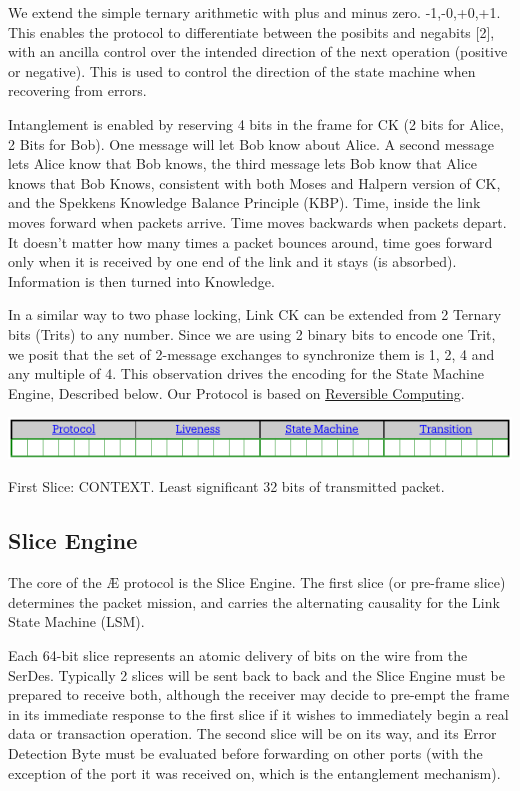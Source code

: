 \documentclass[../HFT-main.tex]{subfiles}
\begin{document}
We extend the simple ternary arithmetic with plus and minus zero. {-1,-0,+0,+1}. This enables the protocol to differentiate between the posibits and negabits [2], with an ancilla control over the intended direction of the next operation (positive or negative). This is used to control the direction of the state machine when recovering from errors.

Intanglement is enabled by reserving 4 bits in the frame for CK (2 bits for Alice, 2 Bits for Bob). One message will let Bob know about Alice.  A second message lets Alice know that Bob knows, the third message lets Bob know that Alice knows that Bob Knows, consistent with both Moses and Halpern version of CK, and the Spekkens Knowledge Balance Principle (KBP).
Time, inside the link moves forward when packets arrive. Time moves backwards when packets depart. It doesn’t matter how many times a packet bounces around, time goes forward only when it is received by one end of the link and it stays (is absorbed). Information is then turned into Knowledge. 

In a similar way to two phase locking, Link CK can be extended from 2 Ternary bits (Trits) to any number. Since we are using 2 binary bits to encode one Trit, we posit that the set of 2-message exchanges to synchronize them is 1, 2, 4 and any multiple of 4. This observation drives the encoding for the State Machine Engine, Described below.
Our Protocol is based on \href{https://wiki.xxiivv.com/site/reversible_computing.html}{Reversible Computing}. 

\newpage
 \begin{marginfigure}
 \centering
  \includegraphics[width=1.1\linewidth]{../figures/First-Slice-Encodings.pdf}
\caption{\centering First Slice: CONTEXT. Least significant 32 bits of  transmitted packet.}
\end{marginfigure}

\subsection{Slice Engine}
The core of the Æ protocol is the Slice Engine. The first slice (or pre-frame slice) determines the packet mission, and carries the alternating causality for the Link State Machine (LSM).

Each 64-bit slice represents an atomic delivery of bits on the wire from the SerDes. Typically 2 slices will be sent back to back and the Slice Engine must be prepared to receive both, although the receiver may decide to pre-empt the frame in its immediate response to the first slice if it wishes to immediately begin a real data or transaction operation. The second slice will be on its way, and its Error Detection Byte must be evaluated before forwarding on other ports (with the exception of the port it was received on, which is the entanglement mechanism).
\end{document}
